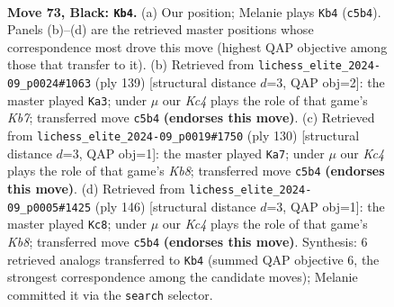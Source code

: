 \documentclass[11pt]{article}
\begin{document}
\clearpage

\begin{figure}[p]\centering
\begin{subfigure}{0.46\textwidth}\centering
\resizebox{\linewidth}{!}{%
\newchessgame
\chessboard[
  setfen={8/6P1/4P3/2k4P/8/6Q1/3K4/8 b - - 4 73},
  showmover=false,
  pgfstyle=straightmove, color=movearrow, markmove={c5-b4}
]}
\caption{}
\end{subfigure}\hfill
\begin{subfigure}{0.46\textwidth}\centering
\resizebox{\linewidth}{!}{%
\newchessgame
\chessboard[
  setfen={8/2Q5/8/8/5P2/3K4/1k5P/8 b - - 0 70},
  showmover=false,
  pgfstyle=straightmove, color=movearrow, markmove={b2-a3}
]}
\caption{}
\end{subfigure}
\\[4pt]
\begin{subfigure}{0.46\textwidth}\centering
\resizebox{\linewidth}{!}{%
\newchessgame
\chessboard[
  setfen={1K6/4k3/2q5/7p/8/5p2/8/8 w - - 2 66},
  showmover=false,
  pgfstyle=straightmove, color=movearrow, markmove={b8-a7}
]}
\caption{}
\end{subfigure}\hfill
\begin{subfigure}{0.46\textwidth}\centering
\resizebox{\linewidth}{!}{%
\newchessgame
\chessboard[
  setfen={1K6/4q3/2k3p1/4p3/8/8/8/8 w - - 6 74},
  showmover=false,
  pgfstyle=straightmove, color=movearrow, markmove={b8-c8}
]}
\caption{}
\end{subfigure}
\caption{\textbf{Move 73, Black: \texttt{Kb4}.} (a) Our position; Melanie plays \texttt{Kb4} (\texttt{c5b4}). Panels (b)--(d) are the retrieved master positions whose correspondence most drove this move (highest QAP objective among those that transfer to it). (b) Retrieved from \texttt{lichess\_elite\_2024-09\_p0024\#1063} (ply 139) [structural distance $d$=3, QAP obj=2]: the master played \texttt{Ka3}; under $\mu$ our \emph{Kc4} plays the role of that game's \emph{Kb7}; transferred move \texttt{c5b4} \textbf{(endorses this move)}. (c) Retrieved from \texttt{lichess\_elite\_2024-09\_p0019\#1750} (ply 130) [structural distance $d$=3, QAP obj=1]: the master played \texttt{Ka7}; under $\mu$ our \emph{Kc4} plays the role of that game's \emph{Kb8}; transferred move \texttt{c5b4} \textbf{(endorses this move)}. (d) Retrieved from \texttt{lichess\_elite\_2024-09\_p0005\#1425} (ply 146) [structural distance $d$=3, QAP obj=1]: the master played \texttt{Kc8}; under $\mu$ our \emph{Kc4} plays the role of that game's \emph{Kb8}; transferred move \texttt{c5b4} \textbf{(endorses this move)}. Synthesis: 6 retrieved analogs transferred to \texttt{Kb4} (summed QAP objective 6, the strongest correspondence among the candidate moves); Melanie committed it via the \texttt{search} selector.}
\label{fig:thought-m145}
\end{figure}
\end{document}
